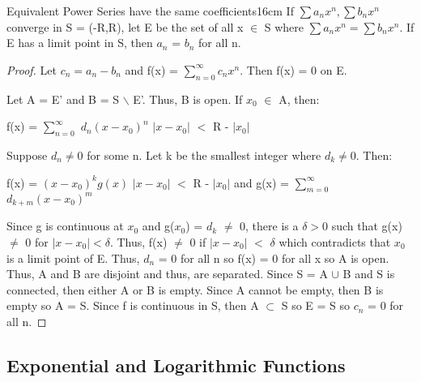     \vspace{0.5cm}



    \begin{wtheorem}{Equivalent Power Series have the same coefficients}{16cm}
        If $\sum a_n x^n, \sum b_nx^n$ converge in S = (-R,R), let E be the
        set of all x $\in$ S where $\sum a_n x^n = \sum b_nx^n$.
        If E has a limit point in S, then $a_n$ = $b_n$ for all n.
    \end{wtheorem}

    \begin{proof}
        Let $c_n = a_n - b_n$ and f(x) = $\sum_{n=0}^{\infty} c_n x^n$.
        Then f(x) = 0 on E.

        Let A = E' and B = S $\backslash$ E'.
        Thus, B is open.
        If $x_0$ $\in$ A, then:

        \hspace{0.5cm}
        f(x) = $\sum_{n=0}^{\infty}$ $d_n(x - x_0)^n$
        \hspace{1cm}
        $|x-x_0|$ $<$ R - $|x_0|$
        
        Suppose $d_n \not = 0$ for some n. Let k be the smallest integer where
        $d_k \not = 0$. Then:
        
        \hspace{0.5cm}
        f(x) = $(x- x_0)^k g(x)$
        \hspace{1cm}
        $|x-x_0|$ $<$ R - $|x_0|$
        and g(x) = $\sum_{m=0}^{\infty}$ $d_{k+m}(x-x_0)^m$

        Since g is continuous at $x_0$ and g($x_0$) = $d_k$ $\not =$ 0,
        there is a $\delta > 0$ such that g(x) $\not =$ 0 for $|x - x_0| < \delta$.
        Thus, f(x) $\not =$ 0 if $|x-x_0|$ $<$ $\delta$ which contradicts
        that $x_0$ is a limit point of E.
        Thus, $d_n$ = 0 for all n so f(x) = 0 for all x so A is open.
        Thus, A and B are disjoint and thus, are separated.
        Since S = A $\cup$ B and S is connected, then either A or B is empty.
        Since A cannot be empty, then B is empty so A = S.
        Since f is continuous in S, then A $\subset$ S so E = S so $c_n$ = 0
        for all n.
    \end{proof}

    \newpage





\subsection{ Exponential and Logarithmic Functions }

